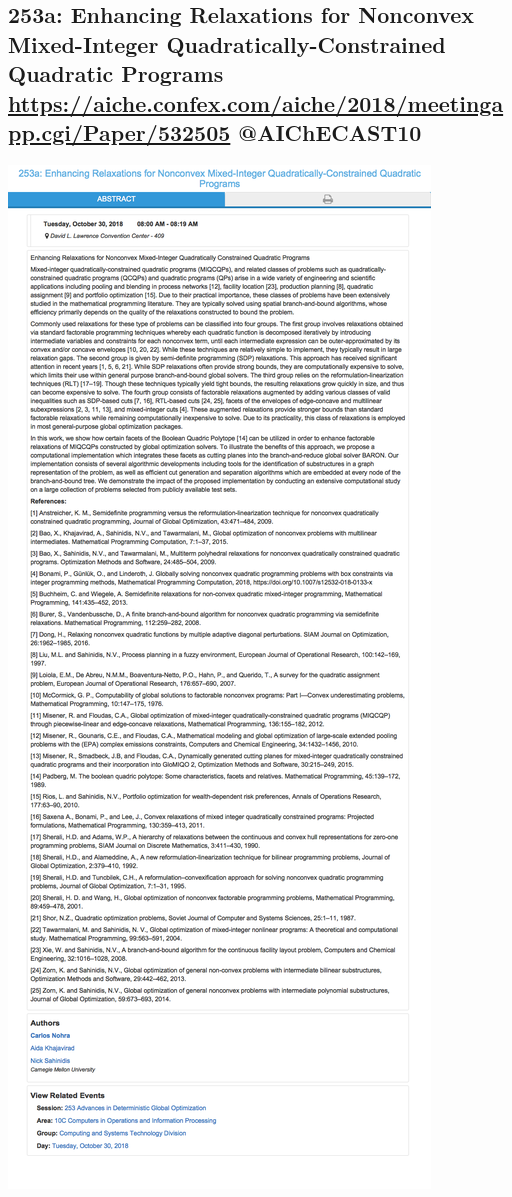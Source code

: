 \documentclass[11pt]{article}
\begin{document}
\subsection{253a: Enhancing Relaxations for Nonconvex Mixed-Integer Quadratically-Constrained Quadratic Programs \url{https://aiche.confex.com/aiche/2018/meetingapp.cgi/Paper/532505} @AIChECAST10}
\label{sec:org3d25332}
\begin{center}
\includegraphics[width=.9\linewidth]{./532505.png}
\end{center}
\end{document}
